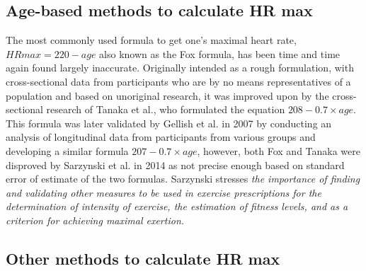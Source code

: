 \subsection*{Age-based methods to calculate HR max}
The most commonly used formula to get one's maximal heart rate, $HRmax=220-age$ also known as the Fox formula, has been time and time again found largely inaccurate.
Originally intended as a rough formulation, with cross-sectional data from participants who are by no means representatives of a population\cite{220-hrmax-new-formula} and based on unoriginal research\cite{220-hrmax-disproved}, it was improved upon by the cross-sectional research of Tanaka et al., who formulated the equation $208-0.7\times age$.
This formula was later validated by Gellish et al. in 2007 by conducting an analysis of longitudinal data from participants from various groups and developing a similar formula $207-0.7\times age$,
however, both Fox and Tanaka were disproved by Sarzynski et al. in 2014 as not precise enough based on standard error of estimate of the two formulas.\cite{hrmax-age-disproved}
Sarzynski stresses \textit{the importance of finding and validating other measures to be used in exercise prescriptions for the determination of intensity of exercise, the estimation of fitness levels, and as a criterion for achieving maximal exertion.}

\subsection*{Other methods to calculate HR max}